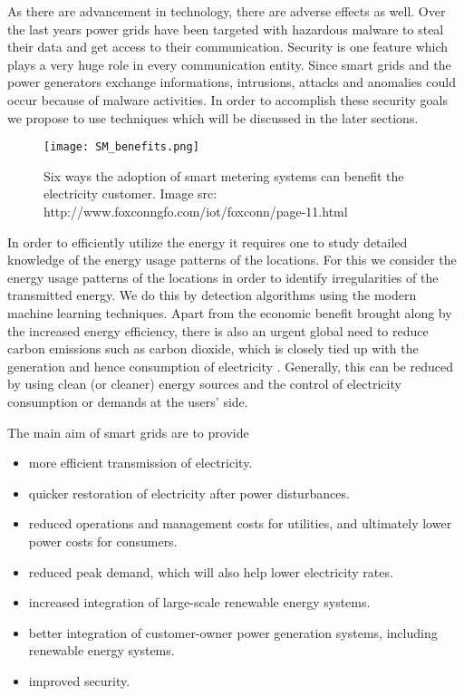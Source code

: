 As there are advancement in technology, there are adverse effects as well. Over the last years power grids have been targeted with hazardous malware to steal their data and get access to their communication. Security is one feature which plays a very huge role in every communication entity. Since smart grids and the power generators exchange informations, intrusions, attacks and anomalies could occur because of malware activities. In order to accomplish these security goals we propose to use techniques which will be discussed in the later sections.

\begin{figure}
\centerline{\texttt{[image: SM\_benefits.png]}}
    \caption{Six ways the adoption of smart metering systems can benefit the electricity customer. 
    {Image src: http://www.foxconngfo.com/iot/foxconn/page-11.html}}
    \label{fig:SM_Benefits}
\end{figure}


In order to efficiently utilize the energy it requires one to study detailed knowledge of the energy usage patterns of the locations. For this we consider the energy usage patterns of the locations in order to identify irregularities of the transmitted energy. We do this by detection algorithms using the modern machine learning techniques. Apart  from  the  economic  benefit  brought along by the increased energy efficiency, there is also an urgent global need to reduce carbon emissions such as carbon dioxide,  which is closely tied up with the generation and hence consumption of electricity \cite{chan2012load}. Generally,  this  can  be  reduced  by  using  clean  (or cleaner) energy sources and the control of electricity consumption  or  demands  at  the  users’  side.

The main aim of smart grids are to provide \begin{itemize}\item more efficient transmission of electricity. \item quicker restoration of electricity after power disturbances. \item reduced operations and management costs for utilities, and ultimately lower power costs for consumers. \item reduced peak demand, which will also help lower electricity rates. \item increased integration of large-scale renewable energy systems. \item better integration of customer-owner power generation systems, including renewable energy systems. \item improved security. \end{itemize}

